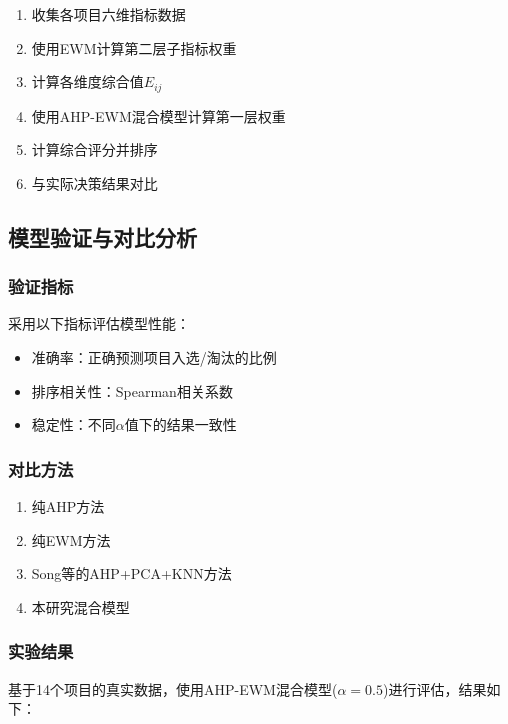\begin{enumerate}
\item 收集各项目六维指标数据
\item 使用EWM计算第二层子指标权重
\item 计算各维度综合值$E_{ij}$
\item 使用AHP-EWM混合模型计算第一层权重
\item 计算综合评分并排序
\item 与实际决策结果对比
\end{enumerate}

\subsection{模型验证与对比分析}

\subsubsection{验证指标}

采用以下指标评估模型性能：
\begin{itemize}
\item 准确率：正确预测项目入选/淘汰的比例
\item 排序相关性：Spearman相关系数
\item 稳定性：不同$\alpha$值下的结果一致性
\end{itemize}

\subsubsection{对比方法}

\begin{enumerate}
\item 纯AHP方法
\item 纯EWM方法
\item Song等\cite{song2025quantifying}的AHP+PCA+KNN方法
\item 本研究混合模型
\end{enumerate}

\subsubsection{实验结果}

基于14个项目的真实数据，使用AHP-EWM混合模型($\alpha=0.5$)进行评估，结果如下：

